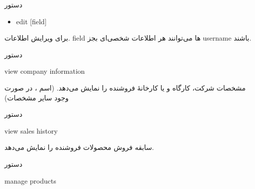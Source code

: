 \documentclass[]{article}
\begin{document}
\begin{mybox}[colback=brilliantlavender]{دستور}

\begin{latin}

\begin{itemize}[label = {$\Rightarrow$}]

\item
edit [field] 

\end{itemize}

\end{latin}

\end{mybox}

برای ویرایش اطلاعات. field ها می‌توانند هر اطلاعات شخصی‌ای بجز username باشند.

\hrulefill

\begin{mybox}[colback=yellow]{دستور}

\begin{latin}

view company information

\end{latin}

\end{mybox}

مشخصات شرکت، کارگاه و یا کارخانهٔ فروشنده را نمایش می‌دهد. (اسم ، در صورت وجود سایر مشخصات) 

\hrulefill

\begin{mybox}[colback=yellow]{دستور}

\begin{latin}

view sales history

\end{latin}

\end{mybox}

سابقه فروش محصولات فروشنده را نمایش می‌دهد.


\hrulefill

\newpage

\begin{mybox}[colback=yellow]{دستور}

\begin{latin}

manage products

\end{latin}

\end{mybox}
\end{document}
